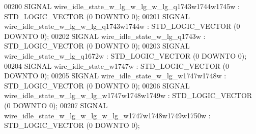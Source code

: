 \begin{DoxyCode}
{00200      \textcolor{keywordflow}{SIGNAL}  \textcolor{vhdlchar}{wire_idle_state_w_lg_w_lg_w_lg_q1743w1744w1745w}    \textcolor{vhdlchar}{:}   \textcolor{comment}{STD\_LOGIC\_VECTOR} \textcolor{vhdlchar}{(}\textcolor{vhdllogic}{}\textcolor{vhdllogic}{0} \textcolor{keywordflow}{DOWNTO} \textcolor{vhdllogic}{}\textcolor{vhdllogic}{0}\textcolor{vhdlchar}{)};
00201      \textcolor{keywordflow}{SIGNAL}  \textcolor{vhdlchar}{wire_idle_state_w_lg_w_lg_q1743w1744w}  \textcolor{vhdlchar}{:}   \textcolor{comment}{STD\_LOGIC\_VECTOR} \textcolor{vhdlchar}{(}\textcolor{vhdllogic}{}\textcolor{vhdllogic}{0} \textcolor{keywordflow}{DOWNTO} \textcolor{vhdllogic}{}\textcolor{vhdllogic}{0}\textcolor{vhdlchar}{)};
00202      \textcolor{keywordflow}{SIGNAL}  \textcolor{vhdlchar}{wire_idle_state_w_lg_q1743w}    \textcolor{vhdlchar}{:}   \textcolor{comment}{STD\_LOGIC\_VECTOR} \textcolor{vhdlchar}{(}\textcolor{vhdllogic}{}\textcolor{vhdllogic}{0} \textcolor{keywordflow}{DOWNTO} \textcolor{vhdllogic}{}\textcolor{vhdllogic}{0}\textcolor{vhdlchar}{)};
00203      \textcolor{keywordflow}{SIGNAL}  \textcolor{vhdlchar}{wire_idle_state_w_lg_q1672w}    \textcolor{vhdlchar}{:}   \textcolor{comment}{STD\_LOGIC\_VECTOR} \textcolor{vhdlchar}{(}\textcolor{vhdllogic}{}\textcolor{vhdllogic}{0} \textcolor{keywordflow}{DOWNTO} \textcolor{vhdllogic}{}\textcolor{vhdllogic}{0}\textcolor{vhdlchar}{)};
00204      \textcolor{keywordflow}{SIGNAL}  \textcolor{vhdlchar}{wire_idle_state_w1747w} \textcolor{vhdlchar}{:}   \textcolor{comment}{STD\_LOGIC\_VECTOR} \textcolor{vhdlchar}{(}\textcolor{vhdllogic}{}\textcolor{vhdllogic}{0} \textcolor{keywordflow}{DOWNTO} \textcolor{vhdllogic}{}\textcolor{vhdllogic}{0}\textcolor{vhdlchar}{)};
00205      \textcolor{keywordflow}{SIGNAL}  \textcolor{vhdlchar}{wire_idle_state_w_lg_w1747w1748w}   \textcolor{vhdlchar}{:}   \textcolor{comment}{STD\_LOGIC\_VECTOR} \textcolor{vhdlchar}{(}\textcolor{vhdllogic}{}\textcolor{vhdllogic}{0} \textcolor{keywordflow}{DOWNTO} \textcolor{vhdllogic}{}\textcolor{vhdllogic}{0}\textcolor{vhdlchar}{)};
00206      \textcolor{keywordflow}{SIGNAL}  \textcolor{vhdlchar}{wire_idle_state_w_lg_w_lg_w1747w1748w1749w} \textcolor{vhdlchar}{:}   \textcolor{comment}{STD\_LOGIC\_VECTOR} \textcolor{vhdlchar}{(}\textcolor{vhdllogic}{}\textcolor{vhdllogic}{0} \textcolor{keywordflow}{DOWNTO} \textcolor{vhdllogic}{}\textcolor{vhdllogic}{0}\textcolor{vhdlchar}{)};
00207      \textcolor{keywordflow}{SIGNAL}  \textcolor{vhdlchar}{wire_idle_state_w_lg_w_lg_w_lg_w1747w1748w1749w1750w}   \textcolor{vhdlchar}{:}   \textcolor{comment}{STD\_LOGIC\_VECTOR} \textcolor{vhdlchar}{(}\textcolor{vhdllogic}{}\textcolor{vhdllogic}{0} \textcolor{keywordflow}{DOWNTO} \textcolor{vhdllogic}{}\textcolor{vhdllogic}{0}\textcolor{vhdlchar}{)};
}
\end{DoxyCode}
